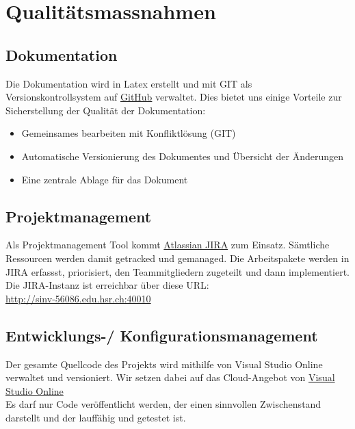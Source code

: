 \chapter{Qualitätsmassnahmen}

\section{Dokumentation}
Die Dokumentation wird in Latex erstellt und mit GIT als Versionskontrollsystem auf \href{https:www.//github.com}{GitHub} verwaltet. Dies bietet uns einige Vorteile zur Sicherstellung der Qualität der Dokumentation:
\\\begin{itemize}
    \item Gemeinsames bearbeiten mit Konfliktlösung (GIT)
    \item Automatische Versionierung des Dokumentes und Übersicht der Änderungen
    \item Eine zentrale Ablage für das Dokument
\end{itemize}


\section{Projektmanagement}
Als Projektmanagement Tool kommt \href{https://www.atlassian.com/software/jira/agile}{Atlassian JIRA} zum Einsatz. Sämtliche Ressourcen werden damit 
getracked und gemanaged. Die Arbeitspakete werden in JIRA erfassst, priorisiert, den Teammitgliedern zugeteilt und dann implementiert. 
Die JIRA-Instanz ist erreichbar über diese URL: 
\\\url{http://sinv-56086.edu.hsr.ch:40010}

\section{Entwicklungs-/ Konfigurationsmanagement}
Der gesamte Quellcode des Projekts wird mithilfe von Visual Studio Online verwaltet und versioniert. Wir setzen dabei auf das Cloud-Angebot von \href{http://www.visualstudio.com/}{Visual Studio Online} 
\\Es darf nur Code veröffentlicht werden, der einen sinnvollen Zwischenstand darstellt und der lauffähig und getestet ist.

